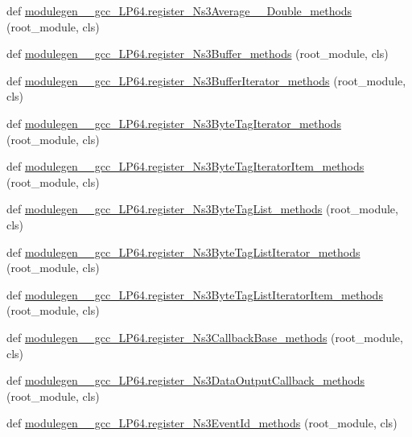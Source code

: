 \begin{DoxyCompactItemize}
\item 
def \hyperlink{namespacemodulegen____gcc__LP64_a8dc1deefed75c3c3f4db58e2a1c74c8d}{modulegen\+\_\+\+\_\+gcc\+\_\+\+L\+P64.\+register\+\_\+\+Ns3\+Average\+\_\+\+\_\+\+Double\+\_\+methods} (root\+\_\+module, cls)
\item 
def \hyperlink{namespacemodulegen____gcc__LP64_ad545f8eb2320e09bf6e5be02690b4eaa}{modulegen\+\_\+\+\_\+gcc\+\_\+\+L\+P64.\+register\+\_\+\+Ns3\+Buffer\+\_\+methods} (root\+\_\+module, cls)
\item 
def \hyperlink{namespacemodulegen____gcc__LP64_a219f36a56f22b6e50de65d276cdf742d}{modulegen\+\_\+\+\_\+gcc\+\_\+\+L\+P64.\+register\+\_\+\+Ns3\+Buffer\+Iterator\+\_\+methods} (root\+\_\+module, cls)
\item 
def \hyperlink{namespacemodulegen____gcc__LP64_ae692c5fa47566ed6b225ae5a5ca35235}{modulegen\+\_\+\+\_\+gcc\+\_\+\+L\+P64.\+register\+\_\+\+Ns3\+Byte\+Tag\+Iterator\+\_\+methods} (root\+\_\+module, cls)
\item 
def \hyperlink{namespacemodulegen____gcc__LP64_ade2c2970e32bf8b776b3624afcc4082d}{modulegen\+\_\+\+\_\+gcc\+\_\+\+L\+P64.\+register\+\_\+\+Ns3\+Byte\+Tag\+Iterator\+Item\+\_\+methods} (root\+\_\+module, cls)
\item 
def \hyperlink{namespacemodulegen____gcc__LP64_ad929f8749eef52cadc734fee358cacd9}{modulegen\+\_\+\+\_\+gcc\+\_\+\+L\+P64.\+register\+\_\+\+Ns3\+Byte\+Tag\+List\+\_\+methods} (root\+\_\+module, cls)
\item 
def \hyperlink{namespacemodulegen____gcc__LP64_aa7b7804ddcf3a3b4d83820f193414ea4}{modulegen\+\_\+\+\_\+gcc\+\_\+\+L\+P64.\+register\+\_\+\+Ns3\+Byte\+Tag\+List\+Iterator\+\_\+methods} (root\+\_\+module, cls)
\item 
def \hyperlink{namespacemodulegen____gcc__LP64_a262c89a667105a6a7bc764058f464ab3}{modulegen\+\_\+\+\_\+gcc\+\_\+\+L\+P64.\+register\+\_\+\+Ns3\+Byte\+Tag\+List\+Iterator\+Item\+\_\+methods} (root\+\_\+module, cls)
\item 
def \hyperlink{namespacemodulegen____gcc__LP64_a911c07db6d52106940012fbb077a0853}{modulegen\+\_\+\+\_\+gcc\+\_\+\+L\+P64.\+register\+\_\+\+Ns3\+Callback\+Base\+\_\+methods} (root\+\_\+module, cls)
\item 
def \hyperlink{namespacemodulegen____gcc__LP64_af601830eaa907717f520b7ffe853c5d4}{modulegen\+\_\+\+\_\+gcc\+\_\+\+L\+P64.\+register\+\_\+\+Ns3\+Data\+Output\+Callback\+\_\+methods} (root\+\_\+module, cls)
\item 
def \hyperlink{namespacemodulegen____gcc__LP64_a11034b778f9a07d9c47a0824be6df6c6}{modulegen\+\_\+\+\_\+gcc\+\_\+\+L\+P64.\+register\+\_\+\+Ns3\+Event\+Id\+\_\+methods} (root\+\_\+module, cls)

\end{DoxyCompactItemize}
